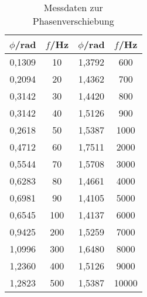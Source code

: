 


%


\begin{table}
  \centering
  \caption{Messdaten zur Phasenverschiebung}
  \label{tab:phasenverschiebung}
  \begin{tabular}{c c c c}
    \toprule
     $\phi$/rad  &	$f$/Hz		&    $\phi$/rad  &	$f$/Hz		  \\
          \midrule
          0,1309   &     10     &       1,3792   &     600      \\
          0,2094   &     20     &       1,4362   &     700      \\
          0,3142   &     30     &       1,4420   &     800      \\
          0,3142   &     40     &       1,5126   &     900      \\
          0,2618   &     50     &       1,5387   &     1000     \\
          0,4712   &     60     &       1,7511   &     2000     \\
          0,5544   &     70     &       1,5708   &     3000     \\
          0,6283   &     80     &       1,4661   &     4000     \\
          0,6981   &     90     &       1,4105   &     5000     \\
          0,6545   &     100    &       1,4137   &     6000     \\
          0,9425   &     200    &       1,5259   &     7000     \\
          1,0996   &     300    &       1,6480   &     8000     \\
          1,2360   &     400    &       1,5126   &     9000     \\
          1,2823   &     500    &       1,5387   &     10000    \\
    \bottomrule
  \end{tabular}
\end{table}

%
